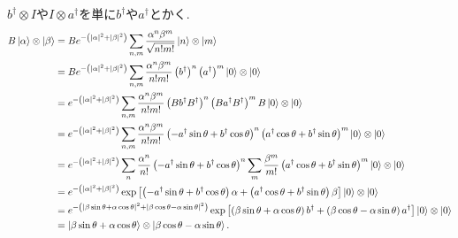\begin{ex}
    \label{ex7.12}
    $b^\dagger \otimes I$や$I \otimes a^\dagger$を単に$b^\dagger$や$a^\dagger$とかく.
    \begin{align*}
        B \ket{\alpha}\otimes\ket{\beta}
         & =
        Be^{- \left(|\alpha|^2 + |\beta|^2 \right)}
        \sum_{n,m}\frac{\alpha^n \beta^m}{ \sqrt{n! m!}} \ket{n} \otimes \ket{m}
        \\
         & =
        Be^{- \left(|\alpha|^2 + |\beta|^2 \right)}
        \sum_{n,m}\frac{\alpha^n \beta^m}{ {n! m!}} \left(b^\dagger\right)^n
        \left(a^\dagger\right)^m \ket{0} \otimes \ket{0}
        \\
         & =
        e^{- \left(|\alpha|^2 + |\beta|^2 \right)}
        \sum_{n,m}\frac{\alpha^n \beta^m}{ {n! m!}}
        \left(B b^\dagger B^\dagger \right)^n
        \left(B a^\dagger B^\dagger \right)^m
        B \ket{0} \otimes \ket{0}
        \\
         & =
        e^{- \left(|\alpha|^2 + |\beta|^2 \right)}
        \sum_{n,m}\frac{\alpha^n \beta^m}{ {n! m!}}
        \left( -a^\dagger \sin\theta + b^\dagger \cos\theta \right)^n
        \left( a^\dagger \cos\theta + b^\dagger \sin\theta\right)^m
        \ket{0} \otimes \ket{0}
        \\
         & =
        e^{- \left(|\alpha|^2 + |\beta|^2 \right)}
        \sum_{n}\frac{\alpha^n}{ n!}
        \left( -a^\dagger \sin\theta + b^\dagger \cos\theta \right)^n
        \sum_{m}\frac{\beta^m}{m!}
        \left( a^\dagger \cos\theta + b^\dagger \sin\theta\right)^m
        \ket{0} \otimes \ket{0}
        \\
         & =
        e^{- \left(|\alpha|^2 + |\beta|^2 \right)}
        \exp \left[ \left(-a^\dagger \sin\theta + b^\dagger \cos\theta  \right) \alpha
            +
            \left( a^\dagger \cos\theta + b^\dagger \sin\theta\right) \beta\right]
        \ket{0} \otimes \ket{0}
        \\
         & =
        e^{- \left(|\beta\sin\theta + \alpha \cos\theta|^2 + |\beta\cos\theta - \alpha \sin\theta|^2 \right)}
        \exp
        \left[ \left(\beta \sin\theta + \alpha \cos\theta  \right) b^\dagger
            +
            \left( \beta \cos\theta - \alpha \sin\theta\right) a^\dagger
            \right]
        \ket{0} \otimes \ket{0}
        \\
         & =
        \ket{\beta \sin\theta + \alpha \cos\theta}
        \otimes
        \ket{\beta \cos\theta - \alpha \sin\theta}.
    \end{align*}

\end{ex}

